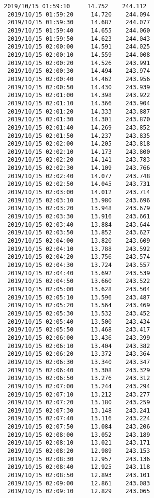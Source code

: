 \documentclass[11pt]{article}
\begin{document}
\begin{Verbatim}[commandchars=\\\{\}]
 2019/10/15 01:59:10     14.752    244.112
 2019/10/15 01:59:20     14.720    244.094
 2019/10/15 01:59:30     14.687    244.077
 2019/10/15 01:59:40     14.655    244.060
 2019/10/15 01:59:50     14.623    244.043
 2019/10/15 02:00:00     14.591    244.025
 2019/10/15 02:00:10     14.559    244.008
 2019/10/15 02:00:20     14.526    243.991
 2019/10/15 02:00:30     14.494    243.974
 2019/10/15 02:00:40     14.462    243.956
 2019/10/15 02:00:50     14.430    243.939
 2019/10/15 02:01:00     14.398    243.922
 2019/10/15 02:01:10     14.366    243.904
 2019/10/15 02:01:20     14.333    243.887
 2019/10/15 02:01:30     14.301    243.870
 2019/10/15 02:01:40     14.269    243.852
 2019/10/15 02:01:50     14.237    243.835
 2019/10/15 02:02:00     14.205    243.818
 2019/10/15 02:02:10     14.173    243.800
 2019/10/15 02:02:20     14.141    243.783
 2019/10/15 02:02:30     14.109    243.766
 2019/10/15 02:02:40     14.077    243.748
 2019/10/15 02:02:50     14.045    243.731
 2019/10/15 02:03:00     14.012    243.714
 2019/10/15 02:03:10     13.980    243.696
 2019/10/15 02:03:20     13.948    243.679
 2019/10/15 02:03:30     13.916    243.661
 2019/10/15 02:03:40     13.884    243.644
 2019/10/15 02:03:50     13.852    243.627
 2019/10/15 02:04:00     13.820    243.609
 2019/10/15 02:04:10     13.788    243.592
 2019/10/15 02:04:20     13.756    243.574
 2019/10/15 02:04:30     13.724    243.557
 2019/10/15 02:04:40     13.692    243.539
 2019/10/15 02:04:50     13.660    243.522
 2019/10/15 02:05:00     13.628    243.504
 2019/10/15 02:05:10     13.596    243.487
 2019/10/15 02:05:20     13.564    243.469
 2019/10/15 02:05:30     13.532    243.452
 2019/10/15 02:05:40     13.500    243.434
 2019/10/15 02:05:50     13.468    243.417
 2019/10/15 02:06:00     13.436    243.399
 2019/10/15 02:06:10     13.404    243.382
 2019/10/15 02:06:20     13.372    243.364
 2019/10/15 02:06:30     13.340    243.347
 2019/10/15 02:06:40     13.308    243.329
 2019/10/15 02:06:50     13.276    243.312
 2019/10/15 02:07:00     13.244    243.294
 2019/10/15 02:07:10     13.212    243.277
 2019/10/15 02:07:20     13.180    243.259
 2019/10/15 02:07:30     13.148    243.241
 2019/10/15 02:07:40     13.116    243.224
 2019/10/15 02:07:50     13.084    243.206
 2019/10/15 02:08:00     13.052    243.189
 2019/10/15 02:08:10     13.021    243.171
 2019/10/15 02:08:20     12.989    243.153
 2019/10/15 02:08:30     12.957    243.136
 2019/10/15 02:08:40     12.925    243.118
 2019/10/15 02:08:50     12.893    243.101
 2019/10/15 02:09:00     12.861    243.083
 2019/10/15 02:09:10     12.829    243.065

\end{Verbatim}
\end{document}
